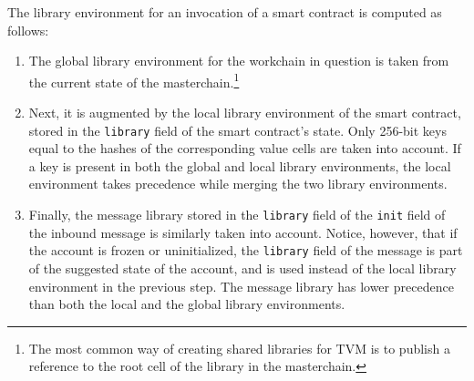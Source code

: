 \documentclass[12pt,oneside]{article}
\begin{document}
The library environment for an invocation of a smart contract is computed as follows:
\begin{enumerate}
\item The global library environment for the workchain in question is taken from the current state of the masterchain.\footnote{The most common way of creating shared libraries for TVM is to publish a reference to the root cell of the library in the masterchain.}
\item Next, it is augmented by the local library environment of the smart contract, stored in the {\tt library} field of the smart contract's state. Only 256-bit keys equal to the hashes of the corresponding value cells are taken into account. If a key is present in both the global and local library environments, the local environment takes precedence while merging the two library environments.
\item Finally, the message library stored in the {\tt library} field of the {\tt init} field of the inbound message is similarly taken into account. Notice, however, that if the account is frozen or uninitialized, the {\tt library} field of the message is part of the suggested state of the account, and is used instead of the local library environment in the previous step. The message library has lower precedence than both the local and the global library environments.
\end{enumerate}
\end{document}

